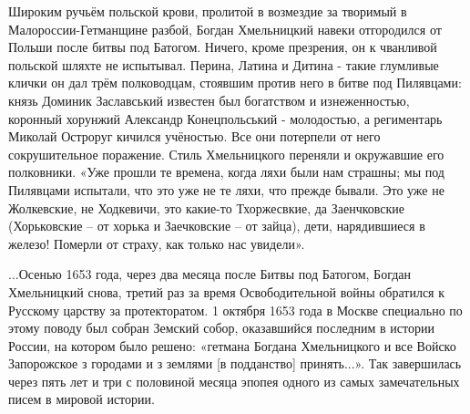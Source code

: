 Широким ручьём польской крови, пролитой в возмездие за творимый в
Малороссии-Гетманщине разбой, Богдан Хмельницкий навеки отгородился от Польши
после битвы под Батогом. Ничего, кроме презрения, он к чванливой польской
шляхте не испытывал. Перина, Латина и Дитина - такие глумливые клички он дал
трём полководцам, стоявшим против него в битве под Пилявцами: князь Доминик
Заславський известен был богатством и изнеженностью, коронный хорунжий
Александр Конецпольський - молодостью, а региментарь Миколай Остроруг кичился
учёностью. Все они потерпели от него сокрушительное поражение. Стиль
Хмельницкого переняли и окружавшие его полковники. «Уже прошли те времена,
когда ляхи были нам страшны; мы под Пилявцами испытали, что это уже не те ляхи,
что прежде бывали. Это уже не Жолкевские, не Ходкевичи, это какие-то
Тхоржесвкие, да Заенчковские (Хорьковские – от хорька и Заечковские – от
зайца), дети, нарядившиеся в железо! Померли от страху, как только нас
увидели».

...Осенью 1653 года, через два месяца после Битвы под Батогом, Богдан Хмельницкий
снова, третий раз за время Освободительной войны обратился к Русскому царству
за протекторатом. 1 октября 1653 года в Москве специально по этому поводу был
собран Земский собор, оказавшийся последним в истории России, на котором было
решено: «гетмана Богдана Хмельницкого и все Войско Запорожское з городами и з
землями [в подданство] принять...». Так завершилась через пять лет и три с
половиной месяца эпопея одного из самых замечательных писем в мировой истории.
